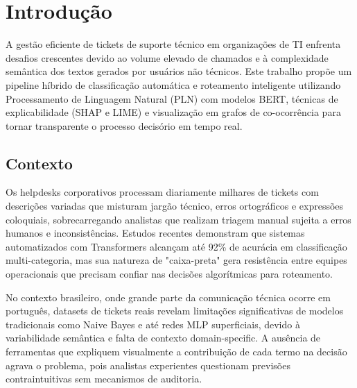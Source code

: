 \documentclass[
    12pt,                %
    openright,           %
    oneside,             %
    a4paper,             %
    english,             %
    brazil               %
]{abntex2}
\begin{document}

\tableofcontents*
\cleardoublepage

\textual

\chapter{Introdução}
\label{cap:introducao}

A gestão eficiente de tickets de suporte técnico em organizações de TI enfrenta desafios crescentes devido ao volume elevado de chamados e à complexidade semântica dos textos gerados por usuários não técnicos. Este trabalho propõe um pipeline híbrido de classificação automática e roteamento inteligente utilizando Processamento de Linguagem Natural (PLN) com modelos BERT, técnicas de explicabilidade (SHAP e LIME) e visualização em grafos de co-ocorrência para tornar transparente o processo decisório em tempo real.


\section{Contexto}
\label{sec:contexto}

Os helpdesks corporativos processam diariamente milhares de tickets com descrições variadas que misturam jargão técnico, erros ortográficos e expressões coloquiais, sobrecarregando analistas que realizam triagem manual sujeita a erros humanos e inconsistências. Estudos recentes demonstram que sistemas automatizados com Transformers alcançam até 92\% de acurácia em classificação multi-categoria, mas sua natureza de "caixa-preta" gera resistência entre equipes operacionais que precisam confiar nas decisões algorítmicas para roteamento.

No contexto brasileiro, onde grande parte da comunicação técnica ocorre em português, datasets de tickets reais revelam limitações significativas de modelos tradicionais como Naive Bayes e até redes MLP superficiais, devido à variabilidade semântica e falta de contexto domain-specific. A ausência de ferramentas que expliquem visualmente a contribuição de cada termo na decisão agrava o problema, pois analistas experientes questionam previsões contraintuitivas sem mecanismos de auditoria.
\end{document}
